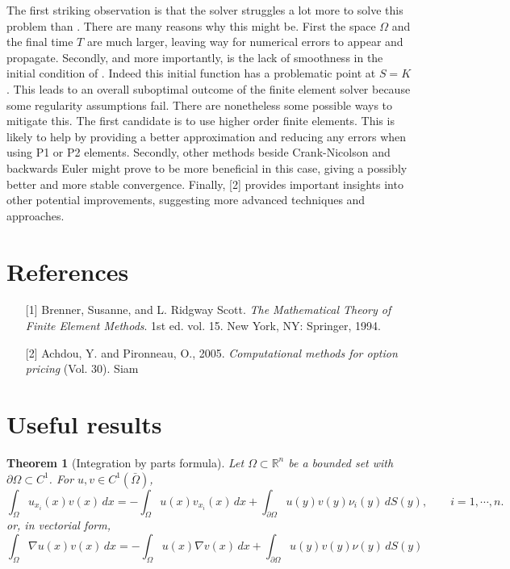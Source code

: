 \documentclass{article}
\newtheorem{thm}{Theorem}[section]
\begin{document}
The first striking observation is that the solver struggles a lot more to solve this problem than . There are many reasons why this might be. First the space $\Omega$ and the final time $T$ are much larger, leaving way for numerical errors to appear and propagate. Secondly, and more importantly, is the lack of smoothness in the initial condition of . Indeed this initial function has a problematic point at $S=K$. This leads to an overall suboptimal outcome of the finite element solver because some regularity assumptions fail. 
There are nonetheless some possible ways to mitigate this. The first candidate is to use higher order finite elements. This is likely to help by providing a better approximation and reducing any errors when using P1 or P2 elements. Secondly, other methods beside Crank-Nicolson and backwards Euler might prove to be more beneficial in this case, giving a possibly better and more stable convergence. Finally, [2] provides important insights into other potential improvements, suggesting more advanced techniques and approaches.


\newpage
\section*{References}
\begin{itemize}
    \item[] [1] Brenner, Susanne, and L. Ridgway Scott. \textit{The Mathematical Theory of Finite Element Methods}. 1st ed. vol. 15. New York, NY: Springer, 1994.
    \item[] [2] Achdou, Y. and Pironneau, O., 2005. \textit{Computational methods for option pricing} (Vol. 30). Siam
\end{itemize}


\appendix
\section{Useful results}


\begin{thm}[Integration by parts formula] \label{thm:by_parts}
Let $\Omega \subset \mathbb{R}^n$ be a bounded set with $\partial\Omega \subset C^1$. For $u, v \in C^1(\bar{\Omega})$,
\[
\int_\Omega u_{x_i}(x)v(x)\,dx = -\int_\Omega u(x)v_{x_i}(x)\,dx + \int_{\partial\Omega} u(y)v(y)\nu_i(y)\,dS(y), \qquad i = 1, \cdots, n.
\]
or, in vectorial form,
\[
\int_\Omega \nabla u(x)v(x)\,dx = -\int_\Omega u(x)\nabla v(x)\,dx + \int_{\partial\Omega} u(y)v(y)\nu(y)\,dS(y)
\]
\end{thm}
\end{document}
